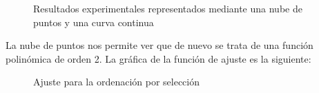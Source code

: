 \documentclass{article}
\begin{document}
\begin{figure}[H]%
    \centering
    \qquad
    \caption{Resultados experimentales representados mediante una nube de puntos y una curva continua}%
    \label{fig:example}%
\end{figure}


La nube de puntos nos permite ver que de nuevo se trata de una función
polinómica de orden 2. La gráfica de la función de ajuste es la
siguiente:

\begin{figure}[H]%
    \centering
    \caption{Ajuste para la ordenación por selección}%
    \label{fig:example}%
\end{figure}
\end{document}
